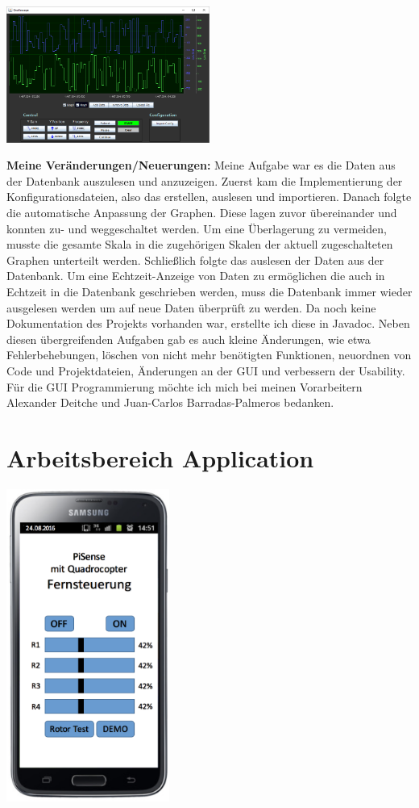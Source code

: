 \documentclass[fleqn,10pt]{SelfArx} %
\begin{document}
\includegraphics[width=0.5\textwidth]{Oscilloscope.png} 

\textbf{Meine Veränderungen/Neuerungen:} \newline 
Meine Aufgabe war es die Daten aus der Datenbank auszulesen und anzuzeigen. Zuerst kam die Implementierung der Konfigurationsdateien, also das erstellen, auslesen und importieren. Danach folgte die automatische Anpassung der Graphen. Diese lagen zuvor übereinander und konnten zu- und weggeschaltet werden. Um eine Überlagerung zu vermeiden, musste die gesamte Skala in die zugehörigen Skalen der aktuell zugeschalteten Graphen unterteilt werden. Schließlich folgte das auslesen der Daten aus der Datenbank. Um eine Echtzeit-Anzeige von Daten zu ermöglichen die auch in Echtzeit in die Datenbank geschrieben werden, muss die Datenbank immer wieder ausgelesen werden um auf neue Daten überprüft zu werden. Da noch keine Dokumentation des Projekts vorhanden war, erstellte ich diese in Javadoc.
\newline 
Neben diesen übergreifenden Aufgaben gab es auch kleine Änderungen, wie etwa Fehlerbehebungen, löschen von nicht mehr benötigten Funktionen, neuordnen von Code und Projektdateien, Änderungen an der GUI und verbessern der Usability.
Für die GUI Programmierung möchte ich mich bei meinen Vorarbeitern Alexander Deitche und Juan-Carlos Barradas-Palmeros bedanken.


\section{Arbeitsbereich Application}
\includegraphics[width=0.4\textwidth]{AppVorlage1.png} 
\newline
{}
\end{document}
